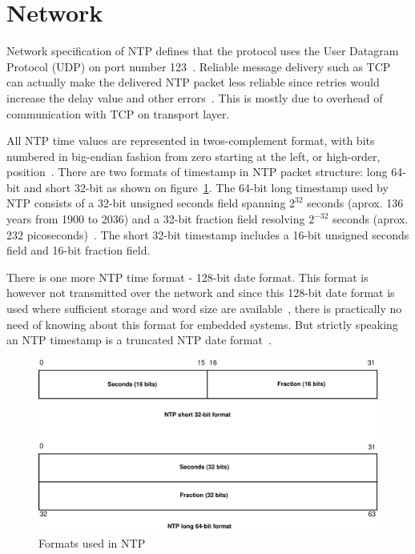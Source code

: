 
\section{Network}\label{sec:ntp-network}
Network specification of NTP defines that
the protocol uses the User Datagram Protocol (UDP) on port number 123~\cite{ianna-ports,rfc5905}.
Reliable message delivery such as TCP can actually make the delivered NTP packet less reliable since retries
would increase the delay value and other errors~\cite{rfc5905}.
This is mostly due to overhead of communication with TCP on transport layer.

All NTP time values are represented in twos-complement format, with
bits numbered in big-endian fashion from zero starting at the left, or high-order, position~\cite{rfc5905}. 
There are two formats of timestamp in NTP packet structure:
long 64-bit and short 32-bit as shown on figure~\ref{fig:ntp-timestamps}.
The 64-bit long timestamp used by NTP consists of a 32-bit unsigned seconds
field spanning $2^{32}$ seconds (aprox. 136 years from 1900 to 2036) and a 32-bit fraction field resolving
$2^{-32}$ seconds (aprox. 232 picoseconds)~\cite{rfc5905}.
The short 32-bit timestamp includes a 16-bit unsigned seconds field
and 16-bit fraction field.

There is one more NTP time format - 128-bit date format.
This format is however not transmitted over the network
and since this 128-bit date format is used where sufficient storage and word
size are available~\cite{rfc5905},
there is practically no need of knowing about this format for embedded systems.
But strictly speaking an NTP timestamp is a truncated NTP date format~\cite{rfc5905}.

\begin{figure}
	\centering
	\includegraphics[width=13cm,keepaspectratio]{fig/ntp-timestamps.pdf}
	\caption{Formats used in NTP}
	\label{fig:ntp-timestamps}
	\bigskip
\end{figure}

